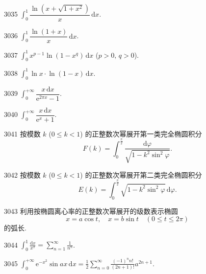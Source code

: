 \begin{prob}[S]{3035}
$\int_0^1 \dfrac{\ln(x + \sqrt{1+x^2})}{x}\,\mathrm{d}x$.
\end{prob}

\begin{prob}[S]{3036}
$\int_0^1 \dfrac{\ln(1+x)}{x}\,\mathrm{d}x$.
\end{prob}

\begin{prob}[S]{3037}
$\int_0^1 x^{p-1} \ln(1 - x^q)\,\mathrm{d}x$ ($p > 0, \, q > 0$).
\end{prob}

\begin{prob}[S]{3038}
$\int_0^1 \ln x \cdot \ln(1-x)\,\mathrm{d}x$.
\end{prob}

\begin{prob}[S]{3039}
$\int_0^{+\infty} \dfrac{x\,\mathrm{d}x}{\mathrm{e}^{2\pi x} - 1}$.
\end{prob}

\begin{prob}[S]{3040}
$\int_0^{+\infty} \dfrac{x\,\mathrm{d}x}{\mathrm{e}^x + 1}$.
\end{prob}

\begin{prob}[M]{3041}
按模数 $k$ ($0 \leqslant k < 1$) 的正整数次幂展开第一类完全椭圆积分
\[
F(k) = \int_0^{\frac{\pi}{2}} \frac{\mathrm{d}\varphi}{\sqrt{1 - k^2 \sin^2\varphi}}.
\]
\end{prob}

\begin{prob}[M]{3042}
按模数 $k$ ($0 \leqslant k < 1$) 的正整数次幂展开第二类完全椭圆积分
\[
E(k) = \int_0^{\frac{\pi}{2}} \sqrt{1 - k^2 \sin^2\varphi}\,\mathrm{d}\varphi.
\]
\end{prob}

\begin{prob}[M]{3043}
利用按椭圆离心率的正整数次幂展开的级数表示椭圆
\[
x = a\cos t, \quad x = b\sin t \quad (0 \leqslant t \leqslant 2\pi)
\]
的弧长.
\end{prob}


\begin{prob}[S]{3044}
$\displaystyle \int_{0}^{1} \frac{\mathrm{d}x}{x^{x}} = \sum_{n=1}^{\infty} \frac{1}{n^{n}}$.
\end{prob}

\begin{prob}[S]{3045}
$\displaystyle \int_{0}^{+\infty} \mathrm{e}^{-x^{2}} \sin ax\,\mathrm{d}x = \frac{1}{2} \sum_{n=0}^{\infty} \frac{(-1)^{n} n!}{(2n+1)!} a^{2n+1}$.
\end{prob}

